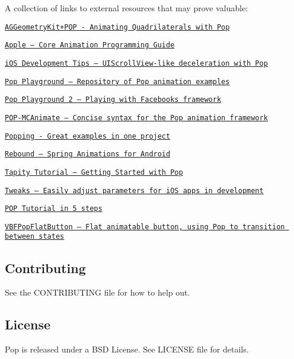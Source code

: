A collection of links to external resources that may prove valuable\+:


\begin{DoxyItemize}
\item \href{https://github.com/hfossli/aggeometrykit-pop}{\tt A\+G\+Geometry\+Kit+\+P\+OP -\/ Animating Quadrilaterals with Pop}
\item \href{https://developer.apple.com/library/mac/documentation/Cocoa/Conceptual/CoreAnimation_guide/Introduction/Introduction.html}{\tt Apple – Core Animation Programming Guide}
\item \href{http://iosdevtips.co/post/84571595353/replicating-uiscrollviews-deceleration-with-facebook}{\tt i\+OS Development Tips – U\+I\+Scroll\+View-\/like deceleration with Pop}
\item \href{https://github.com/callmeed/pop-playground}{\tt Pop Playground – Repository of Pop animation examples}
\item \href{http://victorbaro.com/2014/05/pop-playground-playing-with-facebooks-framework/}{\tt Pop Playground 2 – Playing with Facebook\textquotesingle{}s framework}
\item \href{https://github.com/matthewcheok/POP-MCAnimate}{\tt P\+O\+P-\/\+M\+C\+Animate – Concise syntax for the Pop animation framework}
\item \href{https://github.com/schneiderandre/popping}{\tt Popping -\/ Great examples in one project}
\item \href{http://facebook.github.io/rebound/}{\tt Rebound – Spring Animations for Android}
\item \href{http://tapity.com/tutorial-getting-started-with-pop/}{\tt Tapity Tutorial – Getting Started with Pop}
\item \href{https://github.com/facebook/tweaks}{\tt Tweaks – Easily adjust parameters for i\+OS apps in development}
\item \href{https://github.com/maxmyers/FacebookPop}{\tt P\+OP Tutorial in 5 steps}
\item \href{https://github.com/victorBaro/VBFPopFlatButton}{\tt V\+B\+F\+Pop\+Flat\+Button – Flat animatable button, using Pop to transition between states}
\end{DoxyItemize}

\subsection*{Contributing}

See the C\+O\+N\+T\+R\+I\+B\+U\+T\+I\+NG file for how to help out.

\subsection*{License}

Pop is released under a B\+SD License. See L\+I\+C\+E\+N\+SE file for details. 